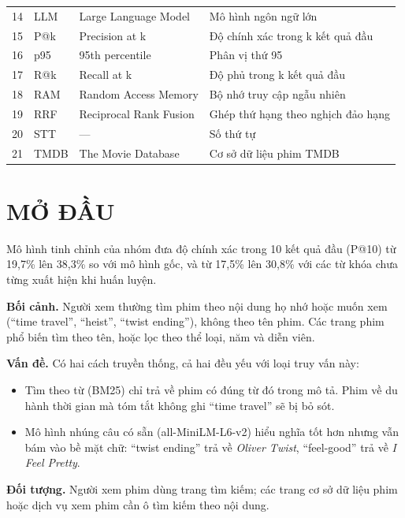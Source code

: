 \documentclass[12pt,a4paper]{article}
\providecommand{\tightlist}{\setlength{\itemsep}{0pt}\setlength{\parskip}{0pt}}
\begin{document}
{\begin{longtable}[]{@{}P{(\linewidth - 6\tabcolsep) * }P{(\linewidth - 6\tabcolsep) * }P{(\linewidth - 6\tabcolsep) * }P{(\linewidth - 6\tabcolsep) * }@{}}
14 & LLM & Large Language Model & Mô hình ngôn ngữ lớn \\
15 & P@k & Precision at k & Độ chính xác trong k kết quả đầu \\
16 & p95 & 95th percentile & Phân vị thứ 95 \\
17 & R@k & Recall at k & Độ phủ trong k kết quả đầu \\
18 & RAM & Random Access Memory & Bộ nhớ truy cập ngẫu nhiên \\
19 & RRF & Reciprocal Rank Fusion & Ghép thứ hạng theo nghịch đảo hạng \\
20 & STT & --- & Số thứ tự \\
21 & TMDB & The Movie Database & Cơ sở dữ liệu phim TMDB \\
\end{longtable}
}

\clearpage
{}
\setcounter{page}{1}
\section{MỞ ĐẦU}

Mô hình tinh chỉnh của nhóm đưa độ chính xác trong 10 kết quả đầu (P@10) từ 19,7\% lên 38,3\% so với mô hình gốc, và từ 17,5\% lên 30,8\% với các từ khóa chưa từng xuất hiện khi huấn luyện.

\textbf{Bối cảnh.} Người xem thường tìm phim theo nội dung họ nhớ hoặc muốn xem (``time travel'', ``heist'', ``twist ending''), không theo tên phim. Các trang phim phổ biến tìm theo tên, hoặc lọc theo thể loại, năm và diễn viên.

\textbf{Vấn đề.} Có hai cách truyền thống, cả hai đều yếu với loại truy vấn này:

\begin{itemize}
\tightlist
\item Tìm theo từ (BM25) chỉ trả về phim có đúng từ đó trong mô tả. Phim về du hành thời gian mà tóm tắt không ghi ``time travel'' sẽ bị bỏ sót.
\item Mô hình nhúng câu có sẵn (all-MiniLM-L6-v2) hiểu nghĩa tốt hơn nhưng vẫn bám vào bề mặt chữ: ``twist ending'' trả về \emph{Oliver Twist}, ``feel-good'' trả về \emph{I Feel Pretty}.
\end{itemize}

\textbf{Đối tượng.} Người xem phim dùng trang tìm kiếm; các trang cơ sở dữ liệu phim hoặc dịch vụ xem phim cần ô tìm kiếm theo nội dung.
\end{document}
